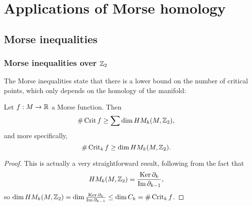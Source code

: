 \chapter{Applications of Morse homology}
\label{chap:app-morse-homology}





\section{Morse inequalities}
\subsection{Morse inequalities over $\Z_2$}

The Morse inequalities state that there is a lower bound on the number of critical points, which only depends on the homology of the manifold:
\begin{theorem}
    Let $f: M \to  \R$ a Morse function. Then
    \[
        \# \Crit f \ge \sum \dim \HMf[k]{M, \Z_2}
    ,\] 
    and more specifically,
    \[
        \# \Crit_k f \ge \dim \HMf[k]{M, \Z_2}
    .\] 
\end{theorem}
\begin{proof}
    This is actually a very straightforward result, following from the fact that \[
    \HMf[k]{M, \Z_2} = \frac{\Ker \partial_k}{\Im \partial_{k-1}},
    \] so $\dim \HMf[k]{M, \Z_2} = \dim \frac{\Ker \partial_k}{\Im \partial_{k-1}} \le  \dim C_k = \# \Crit_k f$.
\end{proof}

